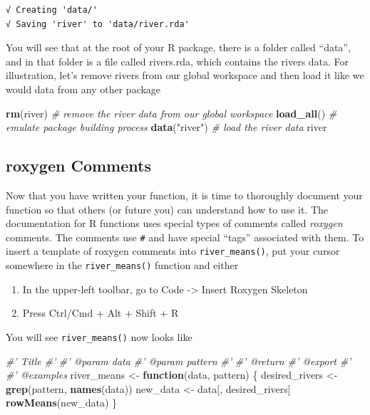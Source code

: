 \documentclass[
]{book}
\newenvironment{Shaded}{\begin{snugshade}}{\end{snugshade}}
\newcommand{\CommentTok}[1]{\textcolor[rgb]{0.56,0.35,0.01}{\textit{#1}}}
\newcommand{\ControlFlowTok}[1]{\textcolor[rgb]{0.13,0.29,0.53}{\textbf{#1}}}
\newcommand{\KeywordTok}[1]{\textcolor[rgb]{0.13,0.29,0.53}{\textbf{#1}}}
\newcommand{\NormalTok}[1]{#1}
\newcommand{\StringTok}[1]{\textcolor[rgb]{0.31,0.60,0.02}{#1}}
\providecommand{\tightlist}{%
  \setlength{\itemsep}{0pt}\setlength{\parskip}{0pt}}
\begin{document}
\begin{verbatim}
√ Creating 'data/'
√ Saving 'river' to 'data/river.rda'
\end{verbatim}

You will see that at the root of your R package, there is a folder called ``data'', and in that folder is a file called rivers.rda, which contains the rivers data. For illustration, let's remove rivers from our global workspace and then load it like we would data from any other package

\begin{Shaded}
\begin{Highlighting}[]
\KeywordTok{rm}\NormalTok{(river) }\CommentTok{# remove the river data from our global workspace}
\KeywordTok{load_all}\NormalTok{() }\CommentTok{# emulate package building process}
\KeywordTok{data}\NormalTok{(}\StringTok{"river"}\NormalTok{) }\CommentTok{# load the river data}
\NormalTok{river}
\end{Highlighting}
\end{Shaded}

\hypertarget{roxygen-comments}{%
\subsection{roxygen Comments}\label{roxygen-comments}}

Now that you have written your function, it is time to thoroughly document your function so that others (or future you) can understand how to use it. The documentation for R functions uses special types of comments called \emph{roxygen} comments. The comments use \texttt{\#\textquotesingle{}} and have special ``tags'' associated with them. To insert a template of roxygen comments into \texttt{river\_means()}, put your cursor somewhere in the \texttt{river\_means()} function and either

\begin{enumerate}
\def\labelenumi{\arabic{enumi}.}
\tightlist
\item
  In the upper-left toolbar, go to Code -\textgreater{} Insert Roxygen Skeleton
\item
  Press Ctrl/Cmd + Alt + Shift + R
\end{enumerate}

You will see \texttt{river\_means()} now looks like

\begin{Shaded}
\begin{Highlighting}[]
\CommentTok{#' Title}
\CommentTok{#'}
\CommentTok{#' @param data }
\CommentTok{#' @param pattern }
\CommentTok{#'}
\CommentTok{#' @return}
\CommentTok{#' @export}
\CommentTok{#'}
\CommentTok{#' @examples}
\NormalTok{river_means <-}\StringTok{ }\ControlFlowTok{function}\NormalTok{(data, pattern) \{}
\NormalTok{  desired_rivers <-}\StringTok{ }\KeywordTok{grep}\NormalTok{(pattern, }\KeywordTok{names}\NormalTok{(data))}
\NormalTok{  new_data <-}\StringTok{ }\NormalTok{data[, desired_rivers]}
  \KeywordTok{rowMeans}\NormalTok{(new_data)}
\NormalTok{\}}
\end{Highlighting}
\end{Shaded}
\end{document}
